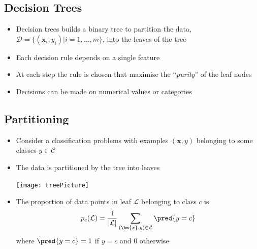 
\begin{slide}
\section{Decision Trees}

\begin{PauseHighLight}
  \begin{itemize}
  \item Decision trees builds a binary tree to partition the data,
    $\mathcal{D}=\{(\bm{x}_i, y_i)|i=1,\ldots,m\}$, into the leaves of
    the tree\pause
  \item Each decision rule depends on a single feature\pause
  \item At each step the rule is chosen that maximise the
    ``\textit{purity}'' of the leaf nodes\pause
  \item Decisions can be made on numerical values or categories\pause
  \end{itemize}
\end{PauseHighLight}

\end{slide}


\begin{slide}
\section[-2]{Partitioning}

\begin{PauseHighLight}
  \begin{itemize}
  \item Consider a classification problems with examples $(\bm{x}, y)$
    belonging to some classes $y\in\mathcal{C}$\pause
  \item The data is partitioned by the tree into leaves
    \begin{center}
      \texttt{[image: treePicture]}\pause
    \end{center}
    \vspace*{-1.6em}

  \item The proportion of data points in leaf $\mathcal{L}$ belonging to
    class $c$ is
    \begin{align*}
      p_{c}(\mathcal{L}) = \frac{1}{|\mathcal{L}|}
      \sum_{(\bm{x},y)\in\mathcal{L}} \pred{y = c}
    \end{align*}
    where $\pred{y = c} = 1$ if $y=c$ and 0 otherwise\pause
  \end{itemize}
\end{PauseHighLight}

\end{slide}

